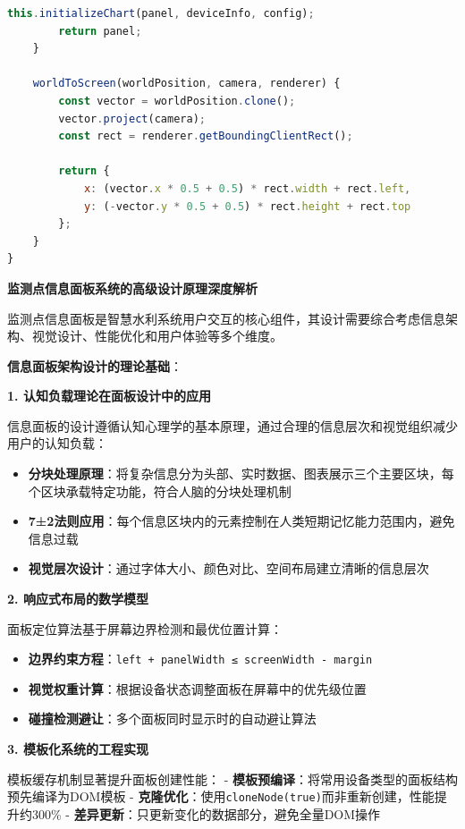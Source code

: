 \begin{lstlisting}[language=Javascript]
        this.initializeChart(panel, deviceInfo, config);
        return panel;
    }
    
    worldToScreen(worldPosition, camera, renderer) {
        const vector = worldPosition.clone();
        vector.project(camera);
        const rect = renderer.getBoundingClientRect();
        
        return {
            x: (vector.x * 0.5 + 0.5) * rect.width + rect.left,
            y: (-vector.y * 0.5 + 0.5) * rect.height + rect.top
        };
    }
}
\end{lstlisting}

\textbf{监测点信息面板系统的高级设计原理深度解析}

监测点信息面板是智慧水利系统用户交互的核心组件，其设计需要综合考虑信息架构、视觉设计、性能优化和用户体验等多个维度。

\textbf{信息面板架构设计的理论基础}：

\textbf{1. 认知负载理论在面板设计中的应用}

信息面板的设计遵循认知心理学的基本原理，通过合理的信息层次和视觉组织减少用户的认知负载：

\begin{itemize}
\tightlist
\item
  \textbf{分块处理原理}：将复杂信息分为头部、实时数据、图表展示三个主要区块，每个区块承载特定功能，符合人脑的分块处理机制
\item
  \textbf{7±2法则应用}：每个信息区块内的元素控制在人类短期记忆能力范围内，避免信息过载
\item
  \textbf{视觉层次设计}：通过字体大小、颜色对比、空间布局建立清晰的信息层次
\end{itemize}

\textbf{2. 响应式布局的数学模型}

面板定位算法基于屏幕边界检测和最优位置计算：

\begin{itemize}
\tightlist
\item
  \textbf{边界约束方程}：\texttt{left + panelWidth ≤ screenWidth - margin}
\item
  \textbf{视觉权重计算}：根据设备状态调整面板在屏幕中的优先级位置
\item
  \textbf{碰撞检测避让}：多个面板同时显示时的自动避让算法
\end{itemize}

\textbf{3. 模板化系统的工程实现}

模板缓存机制显著提升面板创建性能： - \textbf{模板预编译}：将常用设备类型的面板结构预先编译为DOM模板 - \textbf{克隆优化}：使用\texttt{cloneNode(true)}而非重新创建，性能提升约300\% - \textbf{差异更新}：只更新变化的数据部分，避免全量DOM操作

